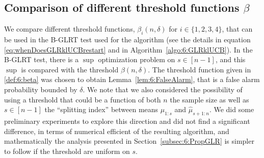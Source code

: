 \subsection{Comparison of different threshold functions $\beta$}\label{sec:6:exploringDifferentThresholdFunctions}

%

We compare different threshold functions, $\beta_i(n,\delta)$ for $i\in\{1,2,3,4\}$, that can be used in the B-GLRT test used for the \GLRklUCB{} algorithm (see the details in equation \eqref{eq:whenDoesGLRklUCBrestart} and in Algorithm~\ref{algo:6:GLRklUCB}).
%
In the B-GLRT test, there is a $\sup$ optimization problem on $s\in[n-1]$, and this $\sup$ is compared with the threshold $\beta(n,\delta)$. The threshold function given in \eqref{def:6:beta} was chosen to obtain Lemma~\ref{lem:6:FalseAlarm}, that is a false alarm probability bounded by $\delta$.
%
We note that we also considered the possibility of using a threshold that could be a function of both $n$ the sample size as well as $s\in[n-1]$ the ``splitting index'' between means $\widehat{\mu}_{1:s}$ and $\widehat{\mu}_{s+1:n}$.
We did some preliminary experiments to explore this direction and did not find a significant difference, in terms of numerical efficient of the resulting \GLRklUCB{} algorithm, and mathematically the analysis presented in Section~\ref{subsec:6:PropGLR} is simpler to follow if the threshold are uniform on $s$.

